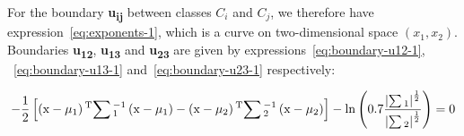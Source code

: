 \documentclass[paper=a4, fontsize=11pt]{scrartcl} %
\numberwithin{equation}{section} %
\numberwithin{figure}{section} %
\numberwithin{table}{section} %
\begin{document}
For the boundary \textbf{u\textsubscript{ij}} between classes {\boldmath$C_i$} and 
{\boldmath$C_j$}, we therefore have expression~\ref{eq:exponents-1}, which is 
a curve on two-dimensional space $(x_1,x_2)$. Boundaries 
\textbf{u\textsubscript{12}}, \textbf{u\textsubscript{13}} and 
\textbf{u\textsubscript{23}} are given by expressions~\ref{eq:boundary-u12-1},
~\ref{eq:boundary-u13-1} and~\ref{eq:boundary-u23-1} respectively:


\begin{equation}
        -\frac{1}{2}\left[\left(\text{x} - \mu_{1}\right)\textsuperscript{T}{\sum\text{$^{-1}_{1}$}}\left(\text{x} - \mu_{1}\right)
        - \left(\text{x} - \mu_{2}\right)\textsuperscript{T}{\sum\text{$^{-1}_{2}$}}\left(\text{x} - \mu_{2}\right)\right] - \ln{\left(0.7\frac{{\left|\sum\text{$_{1}$}\right|}^{\frac{1}{2}}}{{\left|\sum\text{$_{2}$}\right|}^{\frac{1}{2}}}\right)} = 0
    \label{eq:boundary-u12-1}
\end{equation}
\end{document}
